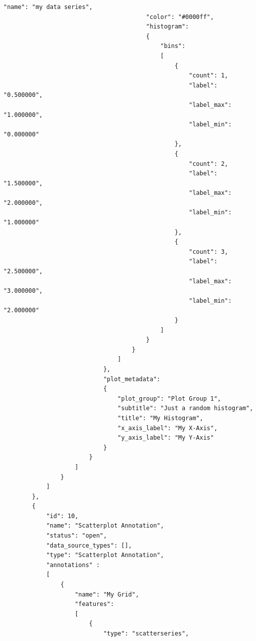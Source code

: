 \begin{lstlisting}[basicstyle=\small\ttfamily]
                                        "name": "my data series",
                                        "color": "#0000ff", 
                                        "histogram": 
                                        {
                                            "bins": 
                                            [
                                                {
                                                    "count": 1,           
                                                    "label": "0.500000",   
                                                    "label_max": "1.000000",
                                                    "label_min": "0.000000"
                                                },
                                                {
                                                    "count": 2,
                                                    "label": "1.500000",
                                                    "label_max": "2.000000",
                                                    "label_min": "1.000000"
                                                },
                                                {
                                                    "count": 3,
                                                    "label": "2.500000",
                                                    "label_max": "3.000000",
                                                    "label_min": "2.000000"
                                                }
                                            ]
                                        }
                                    }
                                ]
                            },
                            "plot_metadata": 
                            {
                                "plot_group": "Plot Group 1",
                                "subtitle": "Just a random histogram",
                                "title": "My Histogram",
                                "x_axis_label": "My X-Axis",
                                "y_axis_label": "My Y-Axis"
                            }
                        }         
                    ]
                }
            ]
        },
        {
            "id": 10,
            "name": "Scatterplot Annotation",
            "status": "open",
            "data_source_types": [],
            "type": "Scatterplot Annotation",
            "annotations" :
            [
                {
                    "name": "My Grid",
                    "features":
                    [
                        {
                            "type": "scatterseries",

\end{lstlisting}
